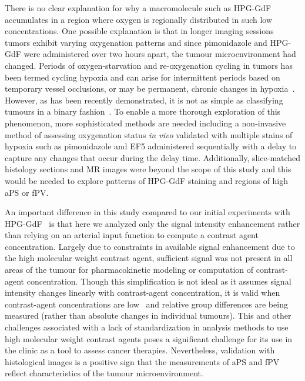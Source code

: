 There is no clear explanation for why a macromolecule such as \acs{HPG-GdF} accumulates in a region where oxygen is regionally distributed in such low concentrations.
One possible explanation is that in longer imaging sessions tumors exhibit varying oxygenation patterns and since pimonidazole and \acs{HPG-GdF} were administered over two hours apart, the tumour microenvironment had changed. 
Periods of oxygen-starvation and re-oxygenation cycling in tumors has been termed cycling hypoxia and can arise for intermittent periods based on temporary vessel occlusions, or may be permanent, chronic changes in hypoxia~\cite{Dewhirst:2009de,Michiels:2016hv}.
However, as has been recently demonstrated, it is not as simple as classifying tumours in a binary fashion~\cite{Bayer:2011js}.
To enable a more thorough exploration of this phenomenon, more sophisticated methods are needed including a non-invasive method of assessing oxygenation status \emph{in vivo} validated with multiple stains of hypoxia such as pimonidazole and EF5 administered sequentially with a delay to capture any changes that occur during the delay time.
Additionally, slice-matched histology sections and MR images were beyond the scope of this study and this would be needed to explore patterns of \acs{HPG-GdF} staining and regions of high \acs{aPS} or \acs{fPV}.

An important difference in this study compared to our initial experiments with \acs{HPG-GdF}~\cite{Baker:2015cob} is that here we analyzed only the signal intensity enhancement rather than relying on an arterial input function to compute a contrast agent concentration.
Largely due to constraints in available signal enhancement due to the high molecular weight contrast agent, sufficient signal was not present in all areas of the tumour for pharmacokinetic modeling or computation of contrast-agent concentration.
Though this simplification is not ideal as it assumes signal intensity changes linearly with contrast-agent concentration, it is valid when contrast-agent concentrations are low~\cite{Heilmann:2006bm} and relative group differences are being measured (rather than absolute changes in individual tumours).
This and other challenges associated with a lack of standardization in analysis methods to use high molecular weight contrast agents poses a significant challenge for its use in the clinic as a tool to assess cancer therapies. 
Nevertheless, validation with histological images is a positive sign that the measurements of \acs{aPS} and \acs{fPV} reflect characteristics of the tumour microenvironment.

